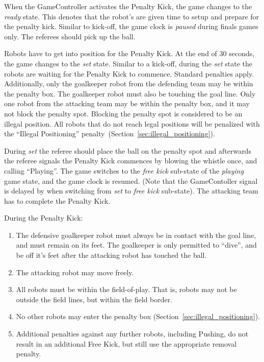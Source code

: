 When the GameController activates the Penalty Kick, the game changes to the \textit{ready} state. This denotes that the robot's are given time to setup and prepare for the penalty kick. Similar to kick-off, the game clock is \textit{paused} during finals games only. The referees should pick up the ball.

Robots have \PenaltyFreeKickSetupTime to get into position for the Penalty Kick. At the end of 30 seconds, the game changes to the \textit{set} state. Similar to a kick-off, during the \textit{set} state the robots are waiting for the Penalty Kick to commence. Standard penalties apply. \\
Additionally, only the goalkeeper robot from the defending team may be within the penalty box. The goalkeeper robot must also be touching the goal line. Only one robot from the attacking team may be within the penalty box, and it may not block the penalty spot. Blocking the penalty spot is considered to be an illegal position. All robots that do not reach legal positions will be penalized with the ``Illegal Positioning'' penalty~(\cf Section~\ref{sec:illegal_positioning}).

During \textit{set} the referee should place the ball on the penalty spot and afterwards the referee signals the Penalty Kick commences by blowing the whistle once, and calling ``Playing''. The game switches to the \textit{free kick} sub-state of the \textit{playing} game state, and the game clock is resumed. (Note that the GameContoller signal is delayed by \PlayingDelayTime when switching from \textit{set} to \textit{free kick} sub-state). The attacking team has \PenaltyFreeKickTime to complete the Penalty Kick.

During the Penalty Kick:
\begin{enumerate}
    \item The defensive goalkeeper robot must always be in contact with the goal line, and must remain on its feet. The goalkeeper is only permitted to ``dive'', and be off it's feet after the attacking robot has touched the ball.
    \item The attacking robot may move freely.
    \item All robots must be within the field-of-play. That is, robots may not be outside the field lines, but within the field border.
    \item No other robots may enter the penalty box (\cf Section~\ref{sec:illegal_positioning}).
    \item Additional penalties against any further robots, including Pushing, do not result in an additional Free
    Kick, but still use the appropriate removal penalty.
\end{enumerate}

